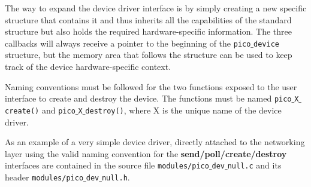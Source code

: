 The way to expand the device driver interface is by simply creating a new specific structure
that contains it and thus inherits all the capabilities of the standard structure but also holds
the required hardware-specific information. The three callbacks will always receive a pointer
to the beginning of the \texttt{pico$\_$device} structure, but the memory area that follows
the structure can be used to keep track of the device hardware-specific context.

Naming conventions must be followed for the two functions exposed to the user interface to
create and destroy the device. The functions must be named \texttt{pico$\_$X$\_$create()} and
\texttt{pico$\_$X$\_$destroy()}, where X is the unique name of the device driver.

As an example of a very simple device driver, directly attached to the networking layer using
the valid naming convention for the \textbf{send/poll/create/destroy} interfaces are contained in the source
file \texttt{modules/pico$\_$dev$\_$null.c} and its header \texttt{modules/pico$\_$dev$\_$null.h}.
